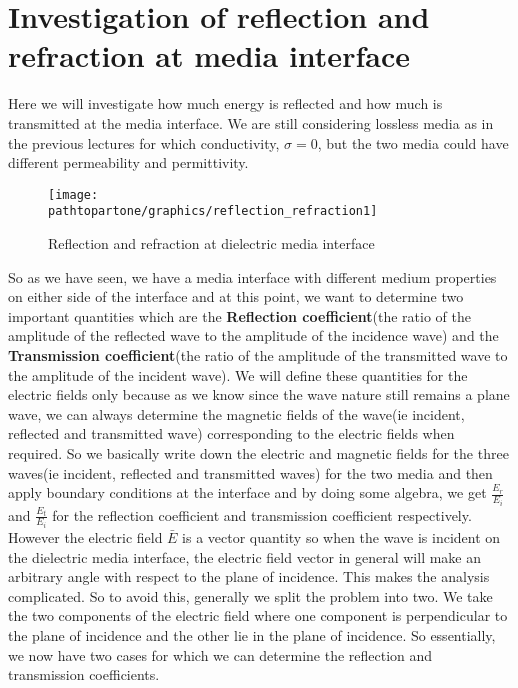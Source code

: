 \chapter{Investigation of reflection and refraction at media interface}\label{lec:lec31}
Here we will investigate how much energy is reflected and how much is transmitted at the media interface. We are still considering lossless media as in the previous lectures for which conductivity, $ \sigma = 0$, but the two media could have different permeability and permittivity.

\begin{figure}[h]
\centering
\texttt{[image: \\pathtopartone/graphics/reflection\_refraction1]}
\caption{Reflection and refraction at dielectric media interface}
\label{fg:11}
\end{figure}

So as we have seen, we have a media interface with different medium properties on either side of the interface and at this point, we want to determine two important quantities which are the \textbf{Reflection coefficient}(the ratio of the amplitude of the reflected wave to the amplitude of the incidence wave) and the \textbf{Transmission coefficient}(the ratio of the amplitude of the transmitted wave to the amplitude of the incident wave). We will define these quantities for the electric fields only because as we know since the wave nature still remains a plane wave, we can always determine the magnetic fields of the wave(ie incident, reflected and transmitted wave) corresponding to the electric fields when required.
So we basically write down the electric and magnetic fields for the three waves(ie incident, reflected and transmitted waves) for the two media and then apply boundary conditions at the interface and by doing some algebra, we get $\frac{E_{r}}{E_{i}}$ and $\frac{E_{t}}{E_{i}}$ for the reflection coefficient and transmission coefficient respectively. However the electric field $\bar{E}$ is a vector quantity so when the wave is incident on the dielectric media interface, the electric field vector in general will make an arbitrary angle with respect to the plane of incidence. This makes the analysis complicated. So to avoid this, generally we split the problem into two. We take the two components of the electric field where one component is perpendicular to the plane of incidence and the other lie in the plane of incidence.
So essentially, we now have two cases for which we can determine the reflection and transmission coefficients.

